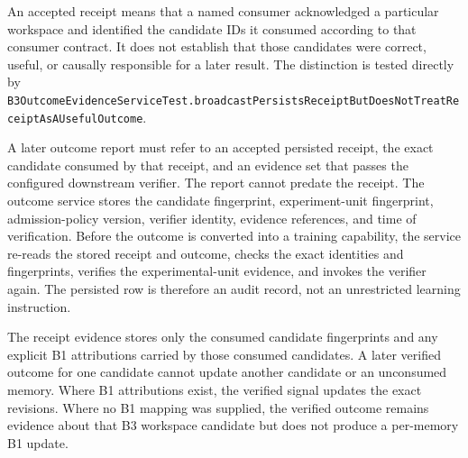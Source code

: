 An accepted receipt means that a named consumer acknowledged a particular workspace and identified the candidate IDs it consumed according to that consumer contract. It does not establish that those candidates were correct, useful, or causally responsible for a later result. The distinction is tested directly by \texttt{B3\allowbreak{}Outcome\allowbreak{}Evidence\allowbreak{}Service\allowbreak{}Test.\allowbreak{}broadcast\allowbreak{}Persists\allowbreak{}Receipt\allowbreak{}But\allowbreak{}Does\allowbreak{}Not\allowbreak{}Treat\allowbreak{}Receipt\allowbreak{}As\allowbreak{}AUseful\allowbreak{}Outcome}.

A later outcome report must refer to an accepted persisted receipt, the exact candidate consumed by that receipt, and an evidence set that passes the configured downstream verifier. The report cannot predate the receipt. The outcome service stores the candidate fingerprint, experiment-unit fingerprint, admission-policy version, verifier identity, evidence references, and time of verification. Before the outcome is converted into a training capability, the service re-reads the stored receipt and outcome, checks the exact identities and fingerprints, verifies the experimental-unit evidence, and invokes the verifier again. The persisted row is therefore an audit record, not an unrestricted learning instruction.

The receipt evidence stores only the consumed candidate fingerprints and any explicit B1 attributions carried by those consumed candidates. A later verified outcome for one candidate cannot update another candidate or an unconsumed memory. Where B1 attributions exist, the verified signal updates the exact revisions. Where no B1 mapping was supplied, the verified outcome remains evidence about that B3 workspace candidate but does not produce a per-memory B1 update.

